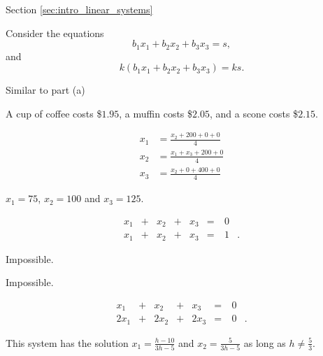  \label{app:answers}

\begin{multicols}{2}
Section \ref{sec:intro_linear_systems}
\obe
\item 
\ba
\item Consider the equations 
\[b_1x_1+b_2x_2 + b_3x_3 = s,\]
and
\[k(b_1x_1+b_2x_2 + b_3x_3) = ks.\]

\item Similar to part (a)

\ea


\item A cup of coffee costs \$$1.95$, a muffin costs \$$2.05$, and a scone costs \$$2.15$. 


\item
\ba
\item 
\begin{align*}
x_1 &= \frac{x_2+200+0+0}{4} \\
x_2 &= \frac{x_1+x_3+200+0}{4} \\
x_3 &= \frac{x_2+0+400+0}{4}
\end{align*}

\item $x_1 = 75$, $x_2 = 100$ and $x_3 = 125$. 

\ea


\item 
\ba
	\item 
\begin{alignat*}{5}
{}x_1 	&{}+{}	&{}x_2	&{}+{}	&{}x_3	&= &\ 0&{}  \\ 
{}x_1 	&{}+{}	&{}x_2	&{}+{}	&{}x_3	&= &\ 1&{.}   
\end{alignat*}

	\item Impossible. 
	
	\item Impossible. 
	
	\item 
\begin{alignat*}{5}
{}x_1 	&{}+{}	&{}x_2	&{}+{}	&{}x_3	&= & \ 0&{}  \\ 
{2}x_1 	&{}+{}	&{2}x_2	&{}+{}	&{2}x_3	&= & \ 0&{.}   
\end{alignat*}

	\ea
			
\item 
\ba
\item This system has the solution $x_1 =  \frac{h-10}{3h-5}$ and $x_2 = \frac{5}{3h-5}$ as long as $h \neq \frac{5}{3}$. 


\end{multicols}
